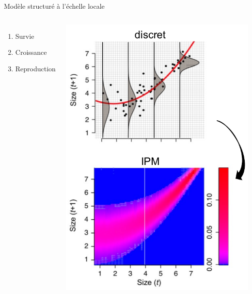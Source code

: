 \documentclass[11pt, compress, aspectratio=1610]{beamer}
\providecommand{\tightlist}{%
  \setlength{\itemsep}{0pt}\setlength{\parskip}{0pt}}
\newcommand{\begincols}{\begin{columns}}
\newcommand{\stopcols}{\end{columns}}
\begin{document}
\begin{frame}{Modèle structuré à l'échelle locale}

\begincols
{}

\begin{enumerate}
    \def\labelenumi{\arabic{enumi}.}
    \tightlist
    \item
      Survie
    \item
      Croissance
    \item
      Reproduction
  \end{enumerate}

\hfill{} \centering
 \includegraphics[scale=0.50]{figures/IPM}\par
\stopcols

\end{frame}
\end{document}
